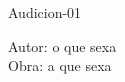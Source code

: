 \begin{defproblem}{Audicion-01}
\begin{onlysolution}
    \begin{solution}
Autor: o que sexa\\
Obra: a que sexa\\
    \end{solution}
\end{onlysolution}

\end{defproblem}
% 
